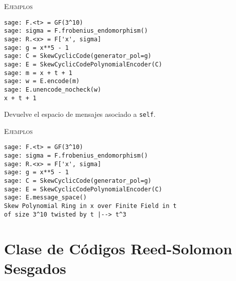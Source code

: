 \begin{description}[font=\ttfamily, style=nextline]
\begin{description}[font=\ttfamily, style=nextline]
        \textsc{Ejemplos}
        \begin{lstlisting}
sage: F.<t> = GF(3^10)
sage: sigma = F.frobenius_endomorphism()
sage: R.<x> = F['x', sigma]
sage: g = x**5 - 1
sage: C = SkewCyclicCode(generator_pol=g)
sage: E = SkewCyclicCodePolynomialEncoder(C)
sage: m = x + t + 1
sage: w = E.encode(m)
sage: E.unencode_nocheck(w)
x + t + 1
        \end{lstlisting}

        \item[message\_space(self)]
        Devuelve el espacio de mensajes asociado a \texttt{self}.

        \textsc{Ejemplos}
        \begin{lstlisting}
sage: F.<t> = GF(3^10)
sage: sigma = F.frobenius_endomorphism()
sage: R.<x> = F['x', sigma]
sage: g = x**5 - 1
sage: C = SkewCyclicCode(generator_pol=g)
sage: E = SkewCyclicCodePolynomialEncoder(C)
sage: E.message_space()
Skew Polynomial Ring in x over Finite Field in t
of size 3^10 twisted by t |--> t^3
        \end{lstlisting}
    \end{description}

\end{description}

\section{Clase de Códigos Reed-Solomon Sesgados}


